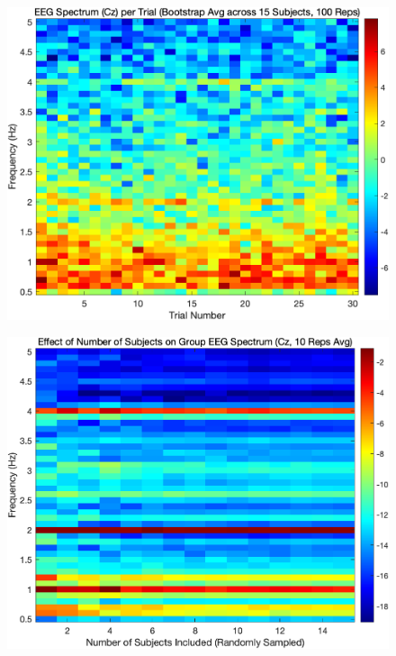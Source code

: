 \documentclass[jou,12pt,floatsintext]{apa7} %
\begin{document}
\begin{figure}[!htb]
    \centering
    \begin{minipage}{0.49\textwidth}
        \centering
        \subcaption{}
        \vspace{-0.5em}
        \includegraphics[width=\textwidth]{figure/fig2.png}
        \label{fig:fig2a}
    \end{minipage}
    \begin{minipage}{0.49\textwidth}
        \centering
        \subcaption{}
        \vspace{-0.5em}
        \includegraphics[width=\textwidth]{figure/fig3.png}

\end{minipage}
\end{figure}
\end{document}
